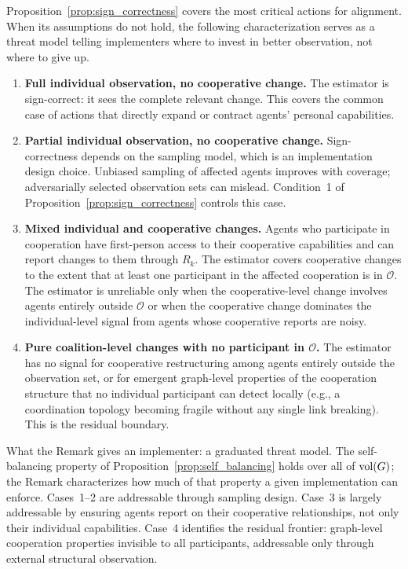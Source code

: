 
\begin{remark}
\label{rem:failure_modes}
Proposition~\ref{prop:sign_correctness} covers the most critical actions for
    alignment. When its assumptions do not hold, the following characterization
    serves as a threat model telling implementers where to invest in better
    observation, not where to give up.

\begin{enumerate}
\item \textbf{Full individual observation, no cooperative change.} The estimator is sign-correct: it sees the complete relevant change. This covers the common case of actions that directly expand or contract agents' personal capabilities.

\item \textbf{Partial individual observation, no cooperative change.} Sign-correctness depends on the sampling model, which is an implementation design choice. Unbiased sampling of affected agents improves with coverage; adversarially selected observation sets can mislead. Condition~1 of Proposition~\ref{prop:sign_correctness} controls this case.

\item \textbf{Mixed individual and cooperative changes.} Agents who participate in cooperation have first-person access to their cooperative capabilities and can report changes to them through $R_k$. The estimator covers cooperative changes to the extent that at least one participant in the affected cooperation is in $\mathcal{O}$. The estimator is unreliable only when the cooperative-level change involves agents entirely outside $\mathcal{O}$ or when the cooperative change dominates the individual-level signal from agents whose cooperative reports are noisy.

\item \textbf{Pure coalition-level changes with no participant in $\mathcal{O}$.} The estimator has no signal for cooperative restructuring among agents entirely outside the observation set, or for emergent graph-level properties of the cooperation structure that no individual participant can detect locally (e.g., a coordination topology becoming fragile without any single link breaking). This is the residual boundary.
\end{enumerate}

What the Remark gives an implementer: a graduated threat model. The self-balancing property of Proposition~\ref{prop:self_balancing} holds over all of $\operatorname{vol}(G)$; the Remark characterizes how much of that property a given implementation can enforce. Cases~1--2 are addressable through sampling design. Case~3 is largely addressable by ensuring agents report on their cooperative relationships, not only their individual capabilities. Case~4 identifies the residual frontier: graph-level cooperation properties invisible to all participants, addressable only through external structural observation.
\end{remark}

